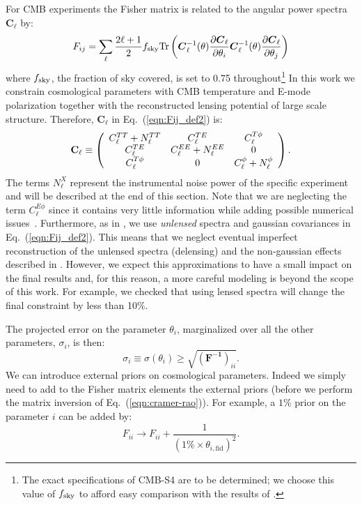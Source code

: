 \documentclass[aps,prd,reprint,superscriptaddress,nofootinbib]{revtex4-1}
\newcommand\refeq[1]{Eq.~(\ref{eqn:#1})}
\begin{document}
For CMB experiments the Fisher matrix is related to the angular power spectra $\boldsymbol{C}_\ell$ by:
\begin{equation}
 F_{ij} = \sum_\ell \frac{2\ell+1}{2} f_{\rm sky} {\rm Tr} \left(  \boldsymbol{C}^{-1}_\ell( \theta) \frac{\partial \boldsymbol{C}_\ell}{\partial \theta_i} \boldsymbol{C}^{-1}_\ell( \theta) \frac{\partial \boldsymbol{C}_\ell}{\partial \theta_j}  \right)
 \label{eqn:Fij_def2}
 \end{equation}
 where $f_{\rm sky}$, the fraction of sky covered, is set to 0.75 throughout\footnote{The exact specifications of CMB-S4 are to be determined; we choose this value of $f_{\rm sky}$ to afford easy comparison with the results of \cite{wu:2014}.}
In this work we constrain cosmological parameters with CMB temperature and E-mode polarization together with the reconstructed lensing potential of large scale structure. Therefore, $\boldsymbol{C}_\ell$ in \refeq{Fij_def2} is:
 \begin{eqnarray}
 	\centering
		\mathbf{C}_\ell \equiv \left( \begin{array}{ccc}C_\ell^{TT} + N_\ell^{TT} & C_\ell^{TE} & C_\ell^{T\phi} \\ C_\ell^{TE} & C_\ell^{EE} + N_\ell^{EE} & 0 \\ C_\ell^{T\phi} & 0 & C_\ell^{\phi} + N_\ell^{\phi}\end{array}\right).
	\label{eqn:cov_definition}
\end{eqnarray}
The terms $N_\ell^{X}$ represent the instrumental noise power of the specific experiment and will be described at the end of this section.
Note that we are neglecting the term $C_\ell^{E\phi}$ since it contains very little information while adding possible numerical issues~\cite{wu:2014,2013PhRvD..87h3008H}.
Furthermore, as in \cite{wu:2014}, we use \textit{unlensed} spectra and gaussian covariances in \refeq{Fij_def2}. 
This means that we neglect eventual imperfect reconstruction of the unlensed spectra (delensing) and the non-gaussian effects described in \cite{benoit-levy:2012} .
However, we expect this approximations to have a small impact on the final results and, for this reason, a more careful modeling is beyond the scope of this work. For example, we checked that using lensed spectra will change the final constraint by less than 10$\%$.

The projected error on the parameter $\theta_i$, marginalized over all the other parameters, $\sigma_i$, is then:
\begin{equation}
\sigma_i \equiv \sigma (\theta_i) \geq \sqrt{(\mathbf{ F^{-1}})_{ii}}.
\label{eqn:cramer-rao}
\end{equation}
We can introduce external priors on cosmological parameters.
Indeed we simply need to add to the Fisher matrix elements the external priors (before we perform the matrix inversion of \refeq{cramer-rao}).
For example, a $1\%$ prior on the parameter $i$ can be added by:
\begin{equation}
F_{ii} \rightarrow F_{ii} + \frac{1}{(1\% \times  \theta_{i,\text{fid}})^2}.
\end{equation}
\end{document}
